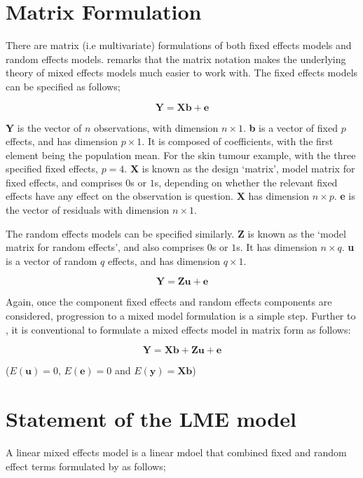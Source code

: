 \documentclass[12pt, a4paper]{report}
\theoremstyle{plain}
\theoremstyle{definition}
\theoremstyle{remark}
\begin{document}
\section{Matrix Formulation} There are matrix (i.e multivariate)
formulations of both fixed effects models and random effects
models. \citet{BrownPrescott} remarks that the matrix notation
makes the underlying theory of mixed effects models much easier to
work with. The fixed effects models can be specified as follows;

\begin{equation}
\textbf{Y} = \textbf{Xb} + \textbf{e}
\end{equation}

\textbf{Y} is the vector of $n$ observations, with dimension $n
\times 1$. \textbf{b} is a vector of fixed $p$ effects, and has
dimension $p \times 1$. It is composed of coefficients, with the
first element being the population mean. For the skin tumour
example, with the three specified fixed effects, $p=4$. \textbf{X}
is known as the design `matrix', model matrix for fixed effects,
and comprises $0$s or $1$s, depending on whether the relevant
fixed effects have any effect on the observation is question.
\textbf{X} has dimension $n \times p$. \textbf{e} is the vector of
residuals with dimension $n \times 1$.

The random effects models can be specified similarly. \textbf{Z}
is known as the `model matrix for random effects', and also
comprises $0$s or $1$s. It has dimension $n \times q$. \textbf{u}
is a vector of random $q$ effects, and has dimension $q \times 1$.

\begin{equation}
\textbf{Y} = \textbf{Zu} + \textbf{e}
\end{equation}

Again, once the component fixed effects and random effects
components are considered, progression to a mixed model
formulation is a simple step. Further to \citet{LW82}, it is
conventional to formulate a mixed effects model in matrix form as
follows:

\begin{equation}
\textbf{Y} = \textbf{Xb} + \textbf{Zu} + \textbf{e}
\end{equation}

($E(\textbf{u})=0$, $E(\textbf{e})=0 $ and $E(\textbf{y}) =
\textbf{Xb}$)


\section{Statement of the LME model}
A linear mixed effects model is a linear mdoel that combined fixed and random effect terms formulated by \citet{LW82} as follows;
\end{document}
